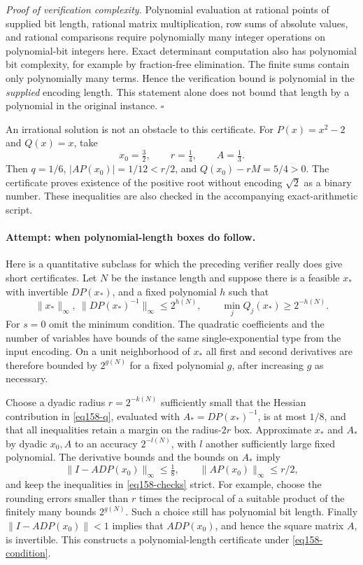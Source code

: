 \documentclass[11pt,a4paper]{article}
\numberwithin{equation}{section}
\begin{document}
\textit{Proof of verification complexity.} Polynomial evaluation at
rational points of supplied bit length, rational matrix multiplication,
row sums of absolute values, and rational comparisons require polynomially
many integer operations on polynomial-bit integers here. Exact determinant
computation also has polynomial bit complexity, for example by
fraction-free elimination. The finite sums contain only polynomially many
terms. Hence the verification bound is polynomial in the \emph{supplied}
encoding length. This statement alone does not bound that length by a
polynomial in the original instance. \hfill$\square$

An irrational solution is not an obstacle to this certificate. For
$P(x)=x^2-2$ and $Q(x)=x$, take
\[
 x_0=\tfrac32,\qquad r=\tfrac14,\qquad A=\tfrac13.
\]
Then $q=1/6$, $|AP(x_0)|=1/12<r/2$, and
$Q(x_0)-rM=5/4>0$. The certificate proves existence of the positive root
without encoding $\sqrt2$ as a binary number. These inequalities are also
checked in the accompanying exact-arithmetic script.

\paragraph{Attempt: when polynomial-length boxes do follow.}
Here is a quantitative subclass for which the preceding verifier really
does give short certificates. Let $N$ be the instance length and suppose
there is a feasible $x_*$ with invertible $DP(x_*)$, and a fixed polynomial
$h$ such that
\begin{equation}\label{eq158-condition}
 \|x_*\|_\infty,\ \|DP(x_*)^{-1}\|_\infty\le2^{h(N)},
 \qquad \min_j Q_j(x_*)\ge2^{-h(N)}.
\end{equation}
For $s=0$ omit the minimum condition. The quadratic coefficients and the
number of variables have bounds of the same single-exponential type from
the input encoding. On a unit neighborhood of $x_*$ all first and second
derivatives are therefore bounded by $2^{g(N)}$ for a fixed polynomial
$g$, after increasing $g$ as necessary.

Choose a dyadic radius $r=2^{-k(N)}$ sufficiently small that the Hessian
contribution in \eqref{eq158-q}, evaluated with
$A_*=DP(x_*)^{-1}$, is at most $1/8$, and that all inequalities retain a
margin on the radius-$2r$ box. Approximate $x_*$ and $A_*$ by dyadic
$x_0,A$ to an accuracy $2^{-l(N)}$, with $l$ another sufficiently large
fixed polynomial. The derivative bounds and the bounds on $A_*$ imply
\[
 \|I-A DP(x_0)\|_\infty\le\tfrac18,\qquad
 \|A P(x_0)\|_\infty\le r/2,
\]
and keep the inequalities in \eqref{eq158-checks} strict. For example,
choose the rounding errors smaller than $r$ times the reciprocal of a
suitable product of the finitely many bounds $2^{g(N)}$. Such a choice
still has polynomial bit length. Finally $\|I-A DP(x_0)\|<1$ implies that
$A DP(x_0)$, and hence the square matrix $A$, is invertible. This constructs
a polynomial-length certificate under \eqref{eq158-condition}.
\end{document}
